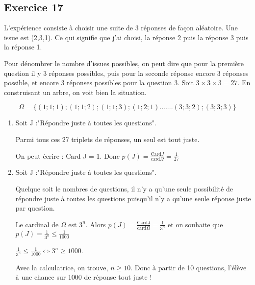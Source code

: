 \documentclass[openany]{book}
\begin{document}
\begin{minipage}{0.5\linewidth}
 
 
\subsection{Exercice 17}
 
L'expérience consiste à choisir une suite de 3 réponses de façon aléatoire. Une issue est (2,3,1). Ce qui signifie que j'ai choisi, la réponse 2 puis la réponse 3 puis la réponse 1. 

Pour dénombrer le nombre d'issues possibles, on peut dire que pour la première question il y 3 réponses possibles, puis pour la seconde réponse encore 3 réponses possible, et encore 3 réponses possibles pour la question 3.
Soit $3\times 3\times 3 = 27$. En construisant un arbre, on voit bien la situation.


$$\Omega = \lbrace (1;1;1); (1;1;2); (1;1;3); (1;2;1).......(3;3;2);(3;3;3)\rbrace$$
 
 
  
\begin{enumerate}
\item Soit J :"Répondre juste à toutes les questions".
 
Parmi tous ces 27 triplets de réponses, un seul est tout juste.
 
On peut écrire : Card J = 1. Donc $p(J)= \frac{\text{Card} J}{\text{card}\Omega}= \frac{1}{27}$
 
\item Soit J :"Répondre juste à toutes les questions".

Quelque soit le nombres de questions, il n'y a qu'une seule possibilité de répondre juste à toutes les questions puisqu'il n'y a qu'une seule réponse juste par question. 


Le cardinal de $\Omega$ est $3^n$. Alors  $p(J)= \frac{\text{Card} J}{\text{card}\Omega}= \frac{1}{3^n}$ et on souhaite que $p(J)= \frac{1}{3^n} \leq \frac{1}{1000}$

$ \frac{1}{3^n} \leq \frac{1}{1000} \Longleftrightarrow 3^n \geq 1000$.

Avec la calculatrice, on trouve, $n \geq 10$. Donc à partir de 10 questions, l'élève à une chance sur 1000 de réponse tout juste !
 
  
\end{enumerate}
 
 
 
\end{minipage}
 
\end{document}

